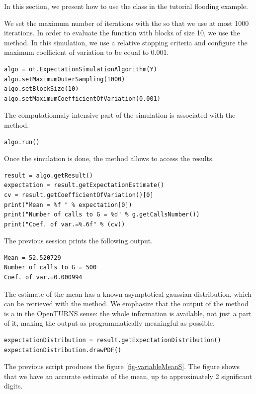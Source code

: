 \documentclass{uncecomp2019}
\begin{document}
In this section, we present how to use the  class 
in the tutorial flooding example. 

We set the maximum number of iterations with the  so that 
we use at most 1000 iterations. 
In order to evaluate the function with blocks of size 10, we use the  method. 
In this simulation, we use a relative stopping criteria and configure the 
maximum coefficient of variation to be equal to 0.001.
\begin{lstlisting}
algo = ot.ExpectationSimulationAlgorithm(Y)
algo.setMaximumOuterSampling(1000)
algo.setBlockSize(10)
algo.setMaximumCoefficientOfVariation(0.001)
\end{lstlisting}
The computationnaly intensive part of the simulation is associated with the 
 method. 
\begin{lstlisting}
algo.run()
\end{lstlisting}
Once the simulation is done, the  method allows to 
access the results.
\begin{lstlisting}
result = algo.getResult()
expectation = result.getExpectationEstimate()
cv = result.getCoefficientOfVariation()[0]
print("Mean = %f " % expectation[0])
print("Number of calls to G = %d" % g.getCallsNumber())
print("Coef. of var.=%.6f" % (cv))
\end{lstlisting}
The previous session prints the following output.
\begin{lstlisting}
Mean = 52.520729 
Number of calls to G = 500
Coef. of var.=0.000994
\end{lstlisting}
The estimate of the mean has a known asymptotical gaussian distribution, which can be retrieved 
with the  method.
We emphasize that the output of the  method is 
a  in the OpenTURNS sense: the whole information is available, 
not just a part of it, making the output as programmatically meaningful as possible. 
\begin{lstlisting}
expectationDistribution = result.getExpectationDistribution()
expectationDistribution.drawPDF()
\end{lstlisting}
The previous script produces the figure \ref{fig-variableMeanS}. 
The figure shows that we have an accurate estimate of the mean, 
up to approximately 2 significant digits. 
\end{document}
